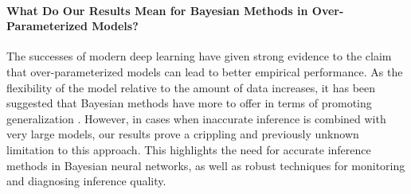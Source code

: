 \documentclass[twoside]{article}
\theoremstyle{theoremstyle}
\begin{document}
\paragraph{What Do Our Results Mean for Bayesian Methods in Over-Parameterized Models?}
The successes of modern deep learning have given strong evidence to the claim that over-parameterized models can lead to better empirical performance.  As the flexibility of the model relative to the amount of data increases, it has been suggested that Bayesian methods have more to offer in terms of promoting generalization \citep{NEURIPS2020_322f6246}. However, in cases when inaccurate inference is combined with very large models, our results prove a crippling and previously unknown limitation to this approach. This highlights the need for accurate inference methods in Bayesian neural networks, as well as robust techniques for monitoring and diagnosing inference quality.



\end{document}
